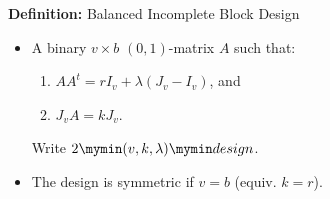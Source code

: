 \documentclass{beamer}
\newcommand{\bibd}[1]{2 \mymin #1 \mymin design}
\begin{document}

  



\begin{frame}

  \begin{block}{{\bf Definition:} Balanced Incomplete Block Design}
    \begin{itemize}
    \item A binary $v \times b$ $(0,1)$-matrix $A$ such that:
      \begin{enumerate}
      \item $AA^t = rI_v + \lambda(J_v-I_v)$, and
      \item $J_vA = kJ_v$.
      \end{enumerate}
      Write $\bibd{(v,k,\lambda)}$.
    \item The design is symmetric if $v=b$ (equiv. $k=r$).
    \end{itemize}
  \end{block}

\end{frame}
\end{document}
